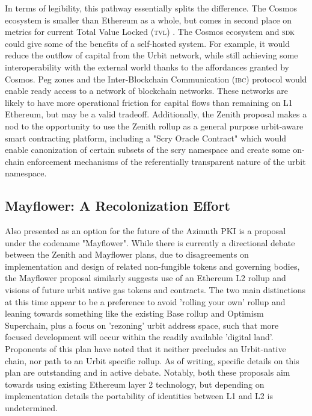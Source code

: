 \documentclass[twoside]{article}
\begin{document}
In terms of legibility, this pathway essentially splits the difference. The Cosmos ecosystem is smaller than Ethereum as a whole, but comes in second place on metrics for current Total Value Locked (\textsc{tvl}) \citep{CosmosTVL}.  The Cosmos ecosystem and \textsc{sdk} could give some of the benefits of a self-hosted system. For example, it would reduce the outflow of capital from the Urbit network, while still achieving some interoperability with the external world thanks to the affordances granted by Cosmos. Peg zones and the Inter-Blockchain Communication (\textsc{ibc}) protocol would enable ready access to a network of blockchain networks. These networks are likely to have more operational friction for capital flows than remaining on L1 Ethereum, but may be a valid tradeoff. Additionally, the Zenith proposal makes a nod to the opportunity to use the Zenith rollup as a general purpose urbit-aware smart contracting platform, including a "Scry Oracle Contract" which would enable canonization of certain subsets of the scry namespace and create some on-chain enforcement mechanisms of the referentially transparent nature of the urbit namespace.

\subsection{Mayflower: A Recolonization Effort}

Also presented as an option for the future of the Azimuth PKI is a proposal under the codename "Mayflower". While there is currently a directional debate between the Zenith and Mayflower plans, due to disagreements on implementation and design of related non-fungible tokens and governing bodies, the Mayflower proposal similarly suggests use of an Ethereum L2 rollup and visions of future urbit native gas tokens and contracts. The two main distinctions at this time appear to be a preference to avoid 'rolling your own' rollup and leaning towards something like the existing Base rollup and Optimism Superchain, plus a focus on 'rezoning' urbit address space, such that more focused development will occur within the readily available 'digital land'. Proponents of this plan have noted that it neither precludes an Urbit-native chain, nor path to an Urbit specific rollup. As of writing, specific details on this plan are outstanding and in active debate. Notably, both these proposals aim towards using existing Ethereum layer 2 technology, but depending on implementation details the portability of identities between L1 and L2 is undetermined.
\end{document}
